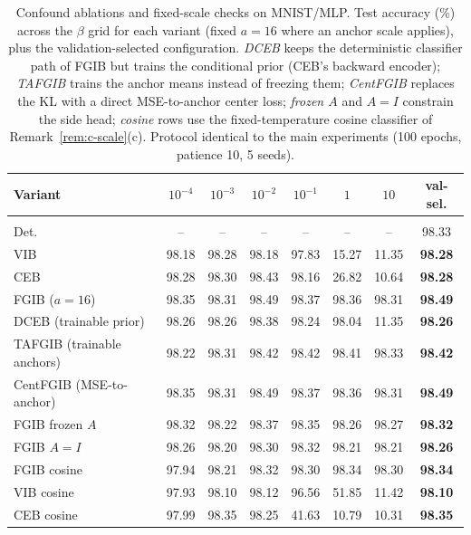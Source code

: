 \begin{table}[t]
\caption{Confound ablations and fixed-scale checks on MNIST/MLP. Test accuracy (\%) across the $\beta$ grid for each variant (fixed $a=16$ where an anchor scale applies), plus the validation-selected configuration. \emph{DCEB} keeps the deterministic classifier path of FGIB but trains the conditional prior (CEB's backward encoder); \emph{TAFGIB} trains the anchor means instead of freezing them; \emph{CentFGIB} replaces the KL with a direct MSE-to-anchor center loss; \emph{frozen $A$} and \emph{$A{=}I$} constrain the side head; \emph{cosine} rows use the fixed-temperature cosine classifier of Remark~\ref{rem:c-scale}(c). Protocol identical to the main experiments (100 epochs, patience 10, 5 seeds).}
\label{tab:ablation}
\begin{center}\small
\begin{tabular}{lccccccc}
Variant & $10^{-4}$ & $10^{-3}$ & $10^{-2}$ & $10^{-1}$ & $1$ & $10$ & val-sel. \\ \hline \\[-1.8ex]
Det. & -- & -- & -- & -- & -- & -- & 98.33 \\
VIB & 98.18 & 98.28 & 98.18 & 97.83 & 15.27 & 11.35 & \textbf{98.28} \\
CEB & 98.28 & 98.30 & 98.43 & 98.16 & 26.82 & 10.64 & \textbf{98.28} \\
FGIB ($a{=}16$) & 98.35 & 98.31 & 98.49 & 98.37 & 98.36 & 98.31 & \textbf{98.49} \\
DCEB (trainable prior) & 98.26 & 98.26 & 98.38 & 98.24 & 98.04 & 11.35 & \textbf{98.26} \\
TAFGIB (trainable anchors) & 98.22 & 98.31 & 98.42 & 98.42 & 98.41 & 98.33 & \textbf{98.42} \\
CentFGIB (MSE-to-anchor) & 98.35 & 98.31 & 98.49 & 98.37 & 98.36 & 98.31 & \textbf{98.49} \\
FGIB frozen $A$ & 98.32 & 98.22 & 98.37 & 98.35 & 98.26 & 98.27 & \textbf{98.32} \\
FGIB $A{=}I$ & 98.26 & 98.20 & 98.30 & 98.32 & 98.21 & 98.21 & \textbf{98.26} \\
FGIB cosine & 97.94 & 98.21 & 98.32 & 98.30 & 98.34 & 98.30 & \textbf{98.34} \\
VIB cosine & 97.93 & 98.10 & 98.12 & 96.56 & 51.85 & 11.42 & \textbf{98.10} \\
CEB cosine & 97.99 & 98.35 & 98.25 & 41.63 & 10.79 & 10.31 & \textbf{98.35} \\
\end{tabular}\end{center}\end{table}

